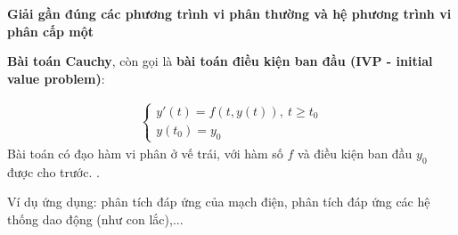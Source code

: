 \documentclass[12pt]{article}
\begin{document}

\sdd





\newpage{}
\Large{\textbf{Giải gần đúng các phương trình vi phân thường và hệ phương trình vi phân cấp một}}


\newpage{}

\textbf{Bài toán Cauchy}, còn gọi là \textbf{bài toán điều kiện ban đầu (IVP - initial value problem)}:

\begin{align}
 \left\lbrace \begin{array}{l}
               y'(t) = f(t,y(t)), ~ t \geq t_0 \\
               y(t_0)=y_0
              \end{array}
\right.
\end{align}
Bài toán có đạo hàm vi phân ở vế trái, với hàm số $f$ và điều kiện ban đầu $y_0$ được cho trước. .

Ví dụ ứng dụng: phân tích đáp ứng của mạch điện, phân tích đáp ứng các hệ thống dao động (như con lắc),...

\newpage{}


\newpage{}
\end{document}
